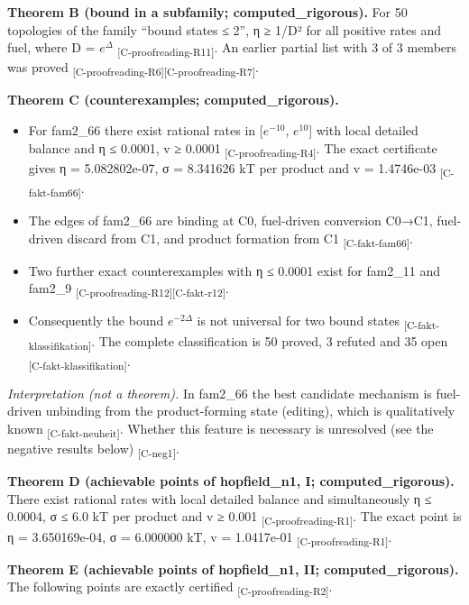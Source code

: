 \documentclass[
  english,
  twocolumn,
  10pt]{article}
\providecommand{\tightlist}{%
  \setlength{\itemsep}{0pt}\setlength{\parskip}{0pt}}
\begin{document}
\textbf{Theorem B (bound in a subfamily; computed\_rigorous).} For 50
topologies of the family ``bound states ≤ 2'', η ≥ 1/D² for all positive
rates and fuel, where D = \(e^{\Delta}\)
\textsubscript{[C-proofreading-R11]}. An earlier partial list with 3 of
3 members was proved
\textsubscript{[C-proofreading-R6]}\textsubscript{[C-proofreading-R7]}.

\textbf{Theorem C (counterexamples; computed\_rigorous).}

\begin{itemize}
\tightlist
\item
  For fam2\_66 there exist rational rates in {[}\(e^{-10}\),
  \(e^{10}\){]} with local detailed balance and η ≤ 0.0001, v ≥ 0.0001
  \textsubscript{[C-proofreading-R4]}. The exact certificate gives η =
  5.082802e-07, σ = 8.341626 kT per product and v = 1.4746e-03
  \textsubscript{[C-fakt-fam66]}.
\item
  The edges of fam2\_66 are binding at C0, fuel-driven conversion C0→C1,
  fuel-driven discard from C1, and product formation from C1
  \textsubscript{[C-fakt-fam66]}.
\item
  Two further exact counterexamples with η ≤ 0.0001 exist for fam2\_11
  and fam2\_9
  \textsubscript{[C-proofreading-R12]}\textsubscript{[C-fakt-r12]}.
\item
  Consequently the bound \(e^{-2\Delta}\) is not universal for two bound
  states \textsubscript{[C-fakt-klassifikation]}. The complete
  classification is 50 proved, 3 refuted and 35 open
  \textsubscript{[C-fakt-klassifikation]}.
\end{itemize}

\emph{Interpretation (not a theorem).} In fam2\_66 the best candidate
mechanism is fuel-driven unbinding from the product-forming state
(editing), which is qualitatively known
\textsubscript{[C-fakt-neuheit]}. Whether this feature is necessary is
unresolved (see the negative results below) \textsubscript{[C-neg1]}.

\textbf{Theorem D (achievable points of hopfield\_n1, I;
computed\_rigorous).} There exist rational rates with local detailed
balance and simultaneously η ≤ 0.0004, σ ≤ 6.0 kT per product and v ≥
0.001 \textsubscript{[C-proofreading-R1]}. The exact point is η =
3.650169e-04, σ = 6.000000 kT, v = 1.0417e-01
\textsubscript{[C-proofreading-R1]}.

\textbf{Theorem E (achievable points of hopfield\_n1, II;
computed\_rigorous).} The following points are exactly certified
\textsubscript{[C-proofreading-R2]}.
\end{document}

